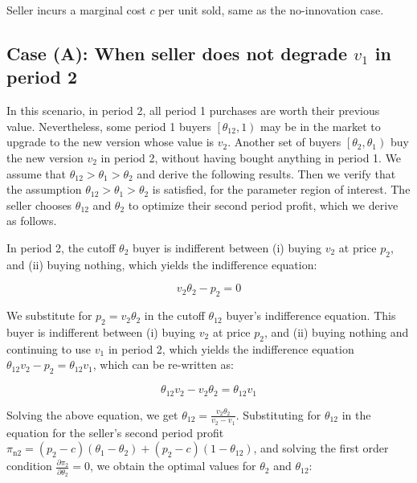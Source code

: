 \documentclass{article}
\begin{document}
Seller incurs a marginal cost \(c\) per unit sold, same as the no-innovation case. 

\subsection*{Case (A): When seller does not degrade \(v_1\) in period 2}

In this scenario, in period 2, all period 1 purchases are worth their previous value. Nevertheless, some { }period 1 buyers \(\left.\left[\theta
_{12},1\right.\right)\) may be in the market to upgrade to the new version whose value is \(v_2\). Another set of buyers \(\left.\left[\theta _2,\theta
_1\right.\right)\) buy the new version \(v_2\) in period 2, without having bought anything in period 1. We assume that \(\theta _{12}>\theta _1>\theta
_2\) and derive the following results. Then we verify that the assumption \(\theta _{12}>\theta _1>\theta _2\) is satisfied, for the parameter region
of interest. The seller chooses \(\theta _{12}\) and \(\theta _2\) to optimize their second period profit, which we derive as follows.

 In period 2, the cutoff \(\theta _2\) buyer is indifferent between (i) buying \(v_2\) at price \(p_2\), and (ii) buying nothing, which yields the
indifference equation: 

\begin{equation}
v_2 \theta _2-p_2 = 0
\end{equation}

We substitute for \(p_2=v_2\theta _2\) in the cutoff \(\theta _{12}\) buyer{'}s indifference equation. This buyer is indifferent between (i) buying
\(v_2\) at price \(p_2\), and (ii) buying nothing and continuing to use \(v_1\) in period 2, which yields the indifference equation \(\theta _{12}v_2-p_2=\theta
_{12}v_1\), which can be re-written as:

\begin{equation}
\theta _{12}v_2-v_2\theta _2=\theta _{12}v_1
\end{equation}

Solving the above equation, we get \(\theta _{12}=\frac{v_2 \theta _2}{v_2-v_1}\). Substituting for \(\theta _{12}\) in the equation for the seller{'}s
second period profit \(\pi _{\text{n2}}=\left(p_2-c\right)\left(\theta _1-\theta _2\right)+\left(p_2-c\right)\left(1-\theta _{12}\right)\), and solving
the first order condition \(\frac{\partial \pi _2}{\partial \theta _2}=0\), we obtain the optimal values for \(\theta _2\) and \(\theta _{12}\):
\end{document}
